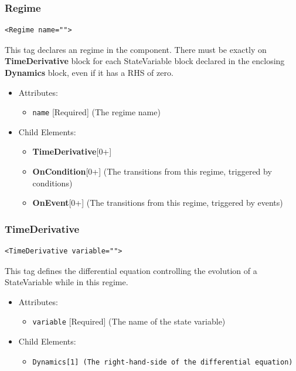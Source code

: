 \documentclass{article}
\newcommand{\Dynamics}{{\bf{Dynamics}}\xspace}
\newcommand{\MathInline}{\tt{Dynamics}}
\newcommand{\TimeDerivative}{{\bf{TimeDerivative}}\xspace}
\newcommand{\OnEvent}{{\bf{OnEvent}}\xspace}
\newcommand{\OnCondition}{{\bf{OnCondition}}\xspace}
\begin{document}
\subsubsection{Regime}
%
\begin{lstlisting}
<Regime name="">
\end{lstlisting}

This tag declares an regime in the component. There must be exactly on
\TimeDerivative block for each StateVariable block declared in the
enclosing \Dynamics block, even if it has a RHS of zero.

\begin{itemize}
\item Attributes:
\begin{itemize}
\item \verb|name| {[}Required{]} (The regime name)
\end{itemize}

\item Child Elements:
\begin{itemize}
\item \TimeDerivative {[}0+{]}
\item \OnCondition {[}0+{]} (The transitions from this regime, triggered by
conditions)
\item \OnEvent {[}0+{]} (The transitions from this regime, triggered by events)
\end{itemize}

\end{itemize}

\subsubsection{TimeDerivative}
%
\begin{lstlisting}
<TimeDerivative variable="">
\end{lstlisting}

This tag defines the differential equation controlling the evolution of a
StateVariable while
in this regime.

\begin{itemize}
\item Attributes:
%
\begin{itemize}
\item \verb|variable| {[}Required{]} (The name of the state variable)
\end{itemize}

\item Child Elements:
%
\begin{itemize}
\item \MathInline {[}1{]} (The right-hand-side of the differential equation)
\end{itemize}
\end{itemize}
\end{document}
